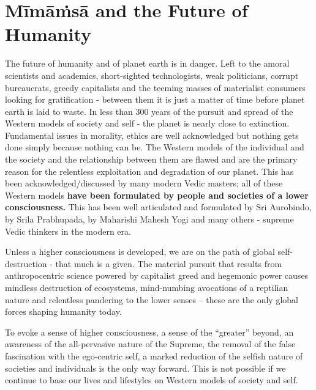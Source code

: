 \section*{Mīmāṁsā and the Future of Humanity}

The future of humanity and of planet earth is in danger. Left to the amoral scientists and academics, short-sighted technologists, weak politicians, corrupt bureaucrats, greedy capitalists and the teeming masses of materialist consumers looking for gratification - between them it is just a matter of time before planet earth is laid to waste. In less than 300 years of the pursuit and spread of the Western models of society and self - the planet is nearly close to extinction. Fundamental issues in morality, ethics are well acknowledged but nothing gets done simply because nothing can be. The Western models of the individual and the society and the relationship between them are flawed and are the primary reason for the relentless exploitation and degradation of our planet. This has been acknowledged/discussed by many modern Vedic masters; all of these Western models \textbf{have been formulated by people and societies of a lower consciousness.} This has been well articulated and formulated by Sri Aurobindo, by Srila Prabhupada, by Maharishi Mahesh Yogi and many others - supreme Vedic thinkers in the modern era.

Unless a higher consciousness is developed, we are on the path of global self-destruction - that much is a given. The material pursuit that results from anthropocentric science powered by capitalist greed and hegemonic power causes mindless destruction of ecosystems, mind-numbing avocations of a reptilian nature and relentless pandering to the lower senses – these are the only global forces shaping humanity today.

To evoke a sense of higher consciousness, a sense of the “greater” beyond, an awareness of the all-pervasive nature of the Supreme, the removal of the false fascination with the ego-centric self, a marked reduction of the selfish nature of societies and individuals is the only way forward. This is not possible if we continue to base our lives and lifestyles on Western models of society and self.

